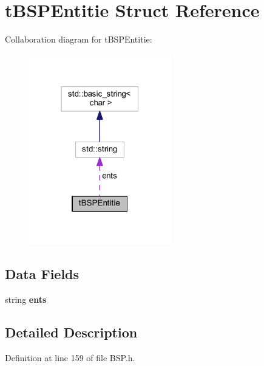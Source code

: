 \hypertarget{structt_b_s_p_entitie}{}\section{t\+B\+S\+P\+Entitie Struct Reference}
\label{structt_b_s_p_entitie}


Collaboration diagram for t\+B\+S\+P\+Entitie\+:
\nopagebreak
\begin{figure}[H]
\begin{center}
\leavevmode
\includegraphics[width=175pt]{structt_b_s_p_entitie__coll__graph}
\end{center}
\end{figure}
\subsection*{Data Fields}
\begin{DoxyCompactItemize}
\item 
string {\bfseries ents}\hypertarget{structt_b_s_p_entitie_a2bf967c89dba86af222728191119bb37}{}\label{structt_b_s_p_entitie_a2bf967c89dba86af222728191119bb37}

\end{DoxyCompactItemize}


\subsection{Detailed Description}


Definition at line 159 of file B\+S\+P.\+h.

